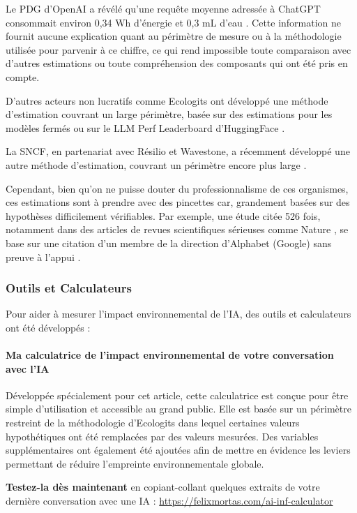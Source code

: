 Le PDG d’OpenAI a révélé qu’une requête moyenne adressée à ChatGPT consommait environ 0,34 Wh d’énergie et 0,3 mL d'eau \cite{altman2025gentle}. Cette information ne fournit aucune explication quant au périmètre de mesure ou à la méthodologie utilisée pour parvenir à ce chiffre, ce qui rend impossible toute comparaison avec d’autres estimations ou toute compréhension des composants qui ont été pris en compte.

D'autres acteurs non lucratifs comme Ecologits ont développé une méthode d'estimation couvrant un large périmètre, basée sur des estimations pour les modèles fermés \cite{Rince2025} ou sur le LLM Perf Leaderboard d'HuggingFace \cite{huggingface_llm_perf_leaderboard}.

La SNCF, en partenariat avec Résilio et Wavestone, a récemment développé une autre méthode d'estimation, couvrant un périmètre encore plus large \cite{sncf_impactia_2026}.

Cependant, bien qu'on ne puisse douter du professionnalisme de ces organismes, ces estimations sont à prendre avec des pincettes car, grandement basées sur des hypothèses difficilement vérifiables.
Par exemple, une étude \cite{DEVRIES20232191} citée 526 fois, notamment dans des articles de revues scientifiques sérieuses comme Nature \cite{Xiao2025}, se base sur une citation d'un membre de la direction d'Alphabet (Google) sans preuve à l'appui \cite{dastin2023focus}.

\subsubsection{Outils et Calculateurs}
Pour aider à mesurer l'impact environnemental de l'IA, des outils et calculateurs ont été développés :

\paragraph{Ma calculatrice de l'impact environnemental de votre conversation avec l'IA}
Développée spécialement pour cet article, cette calculatrice est conçue pour être simple d’utilisation et accessible au grand public.
Elle est basée sur un périmètre restreint de la méthodologie d'Ecologits dans lequel certaines valeurs hypothétiques ont été remplacées par des valeurs mesurées. Des variables supplémentaires ont également été ajoutées afin de mettre en évidence les leviers permettant de réduire l’empreinte environnementale globale.

\textbf{Testez-la dès maintenant} en copiant-collant quelques extraits de votre dernière conversation avec une IA : \url{https://felixmortas.com/ai-inf-calculator}

